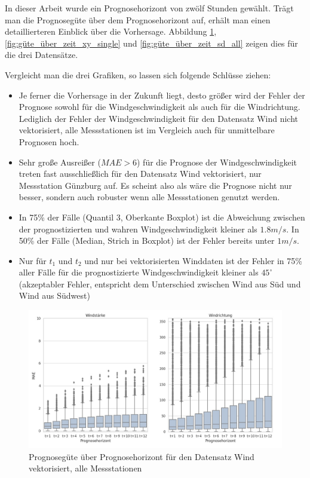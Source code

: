 \documentclass[
12pt, %
toc=listofnumbered, %
toc=chapterentrydotfill, %
numbers=noenddot, %
captions=tableheading, %
bibliography=numbered
]{scrreprt}
\newcommand{\qm}[1]{\glqq#1\grqq{}} %
\begin{document}
In dieser Arbeit wurde ein Prognosehorizont von zwölf Stunden gewählt. Trägt man die Prognosegüte über dem Prognosehorizont auf, erhält man einen detaillierteren Einblick über die Vorhersage. Abbildung \ref{fig:güte_über_zeit_xy_all},  \ref{fig:güte_über_zeit_xy_single} und  \ref{fig:güte_über_zeit_sd_all} zeigen dies für die drei Datensätze.

Vergleicht man die drei Grafiken, so lassen sich folgende Schlüsse ziehen:

\begin{itemize}
	\item Je ferner die Vorhersage in der Zukunft liegt, desto größer wird der Fehler der Prognose sowohl für die Windgeschwindigkeit als auch für die Windrichtung. Lediglich der Fehler der Windgeschwindigkeit für den Datensatz \qm{Wind nicht vektorisiert, alle Messstationen} ist im Vergleich auch für unmittelbare Prognosen hoch.
	\item Sehr große Ausreißer ($MAE > 6$) für die Prognose der Windgeschwindigkeit treten fast ausschließlich für den Datensatz \qm{Wind vektorisiert, nur Messstation Günzburg} auf. Es scheint also als wäre die Prognose nicht nur besser, sondern auch robuster wenn alle Messstationen genutzt werden.
	\item In 75\% der Fälle (Quantil 3, Oberkante Boxplot) ist die Abweichung zwischen der prognostizierten und wahren Windgeschwindigkeit kleiner als $1.8 m/s$. In 50\% der Fälle (Median, Strich in Boxplot) ist der Fehler bereits unter $1 m/s$.
	\item Nur für $t_1$ und $t_2$ und nur bei vektorisierten Winddaten ist der Fehler in 75\% aller Fälle für die prognostizierte Windgeschwindigkeit kleiner als $45^\circ$ (\qm{akzeptabler Fehler}, entspricht dem Unterschied zwischen Wind aus Süd und Wind aus Südwest)
\end{itemize}

\begin{figure}[tph]
	\begin{center}
		\includegraphics[width=\linewidth]{./images/Güte über Prognosehorizont sd via xy-cropped.jpg}
		\caption{Prognosegüte über Prognosehorizont für den Datensatz \qm{Wind vektorisiert, alle Messstationen}}
		\label{fig:güte_über_zeit_xy_all}
	\end{center}
\end{figure}
\end{document}
